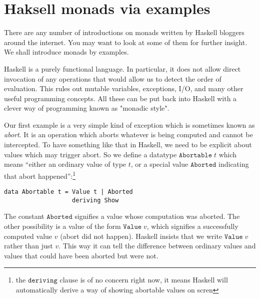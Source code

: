 \documentclass[a4paper,10pt]{article}
\begin{document}




\appendix

\section{Haksell monads via examples}
\label{app:monads}

There are any number of introductions on monads written by Haskell bloggers around the internet. You may want to look at some of them for further insight. We shall introduce monads by examples.

Haskell is a purely functional language. In particular, it does not allow direct invocation of any operations that would allow us to detect the order of evaluation. This rules out mutable variables, exceptions, I/O, and many other useful programming concepts. All these can be put back into Haskell with a clever way of programming known as "monadic style".

Our first example is a very simple kind of exception which is sometimes known as \emph{abort}. It is an operation which aborts whatever is being computed and cannot be intercepted. To have something like that in Haskell, we need to be explicit about values which may trigger abort. So we define a datatype $\mathtt{Abortable}\;t$ which means ``either an ordinary value of type $t$, or a special value $\mathtt{Aborted}$ indicating that abort happened'':\footnote{the $\mathtt{deriving}$ clause   is of no concern right now, it means Haskell will automatically derive a way of showing abortable   values on scren}

\begin{lstlisting}
data Abortable t = Value t | Aborted
                   deriving Show  
\end{lstlisting}
%
The constant $\mathtt{Aborted}$ signifies a value whose computation was aborted. The other possibility is a value of the form $\mathtt{Value}\;v$, which signifies a successfully computed value $v$ (abort did not happen). Haskell insists that we write $\mathtt{Value}\;v$ rather than just $v$. This way it can tell the difference between ordinary values and values that could have been aborted  but were not.
\end{document}

